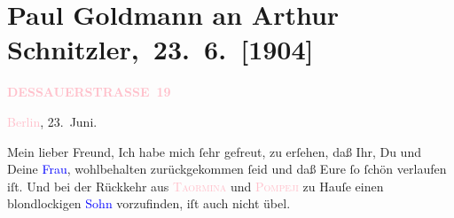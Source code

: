 

\renewcommand{\erwaehntePersonen}{Personen:  Eduard VII., Hugo von Hofmannsthal, Detlev von Liliencron, Max Reinhardt, Theodore Rottenberg, Ludwig Rottenberg, Olga Schnitzler, Heinrich Schnitzler,  Wilhelm II. von Preußen}
\renewcommand{\erwaehnteInstitutionen}{Institutionen: Deutsches Theater Berlin}
\renewcommand{\erwaehnteOrte}{Orte: Berlin, Burgtheater, Dessauer Straße, Deutschland, Edmund-Weiß-Gasse, England, Frankfurt am Main, Kiel, Marienbad, Pompei, Taormina, Wien}
\renewcommand{\erwaehnteWerke}{Werke: Zwischenspiel. Komödie in drei Akten}
\section[ Paul Goldmann an Arthur Schnitzler, 23. 6. {[}1904{]}]{Paul Goldmann an Arthur Schnitzler, 23. 6. {[}1904{]}}
\nopagebreak{}
\rehead{ }\normalsize\beginnumbering{}
\toendnotes[C]{\smallbreak\pagebreak[2]}
\toendnotes[C]{\smallbreak}
\pstart
           \noindent{}\raggedleft{}{\pb}\textcolor{gray}{\textbf{\textcolor{pink}{DESSAUERSTRASSE 19}{}\ledrightnote{\textcolor{pink}{Dessauer Straße}}}}\pend
           
\pstart
           \textcolor{pink}{Berlin}{}\ledrightnote{\textcolor{pink}{Berlin}}, 23. Juni.\pend
           
\pstart\center{}Mein lieber Freund,\pend
\pstart
           Ich habe mich ſehr gefreut, zu erſehen, daß Ihr, Du und Deine \textcolor{blue}{Frau}{}\ledrightnote{{$\rightarrow$}\textcolor{blue}{Olga Schnitzler}}, wohlbehalten zurückgekommen ſeid und
               daß Eure \label{K_L03445-1v}\label{K_L03445-1h} ſo ſchön verlaufen iſt. Und bei der Rückkehr aus \textsc{\textcolor{pink}{Taormina}{}\ledrightnote{\textcolor{pink}{Taormina}}} und \textsc{\textcolor{pink}{Pompeji}{}\ledrightnote{\textcolor{pink}{Pompei}}} zu Hauſe einen blondlockigen \textcolor{blue}{Sohn}{}\ledrightnote{{$\rightarrow$}\textcolor{blue}{Heinrich Schnitzler}} vorzufinden, iſt auch nicht übel.\pend
           
